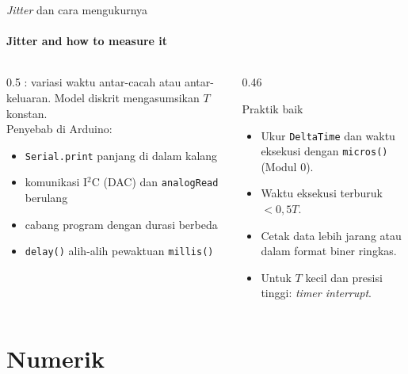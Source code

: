 \documentclass[aspectratio=169,10pt]{beamer}
\begin{document}
\begin{frame}{\textit{Jitter} dan cara mengukurnya}
	\framesubtitle{Jitter and how to measure it}
	\begin{columns}[T]
		\begin{column}{0.5\textwidth}
			\small
			: variasi waktu antar-cacah atau antar-keluaran. Model diskrit mengasumsikan $T$ konstan.\\[3pt]
			Penyebab di Arduino:
			\begin{itemize}
				\item \texttt{Serial.print} panjang di dalam kalang
				\item komunikasi I$^2$C (DAC) dan \texttt{analogRead} berulang
				\item cabang program dengan durasi berbeda
				\item \texttt{delay()} alih-alih pewaktuan \texttt{millis()}
			\end{itemize}
		\end{column}
		\begin{column}{0.46\textwidth}
			\begin{block}{Praktik baik}
				\small
				\begin{itemize}
					\item Ukur \texttt{DeltaTime} dan waktu eksekusi dengan \texttt{micros()} (Modul 0).
					\item Waktu eksekusi terburuk $< 0{,}5T$.
					\item Cetak data lebih jarang atau dalam format biner ringkas.
					\item Untuk $T$ kecil dan presisi tinggi: \textit{timer interrupt}.
				\end{itemize}
			\end{block}
		\end{column}
	\end{columns}
\end{frame}

\section{Numerik\texorpdfstring{\\[4pt]{\Large{}}}{ / Numerics}}
\end{document}
